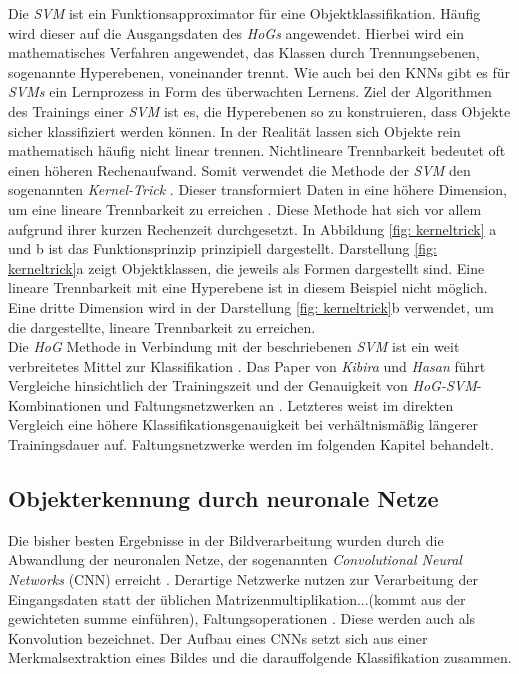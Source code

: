 		
		
		Die \textit{SVM} ist ein Funktionsapproximator für eine Objektklassifikation. Häufig wird dieser auf die Ausgangsdaten des \textit{HoGs} angewendet. Hierbei wird ein mathematisches Verfahren angewendet, das Klassen durch Trennungsebenen, sogenannte Hyperebenen, voneinander trennt. Wie auch bei den KNNs gibt es für \textit{SVMs} ein Lernprozess in Form des überwachten Lernens. Ziel der Algorithmen des Trainings einer \textit{SVM} ist es, die Hyperebenen so zu konstruieren, dass Objekte sicher klassifiziert werden können. In der Realität lassen sich Objekte rein mathematisch häufig nicht linear trennen. Nichtlineare Trennbarkeit bedeutet oft einen höheren Rechenaufwand. Somit verwendet die Methode der \textit{SVM} den sogenannten \textit{Kernel-Trick} \cite{svmalt}. Dieser transformiert Daten in eine höhere Dimension, um eine lineare Trennbarkeit zu erreichen \cite{svmalt}. Diese Methode hat sich vor allem aufgrund ihrer kurzen Rechenzeit durchgesetzt. In Abbildung \ref{fig: kerneltrick} a und b ist das Funktionsprinzip prinzipiell dargestellt. Darstellung \ref{fig: kerneltrick}a zeigt Objektklassen, die jeweils als Formen dargestellt sind. Eine lineare Trennbarkeit mit eine Hyperebene ist in diesem Beispiel nicht möglich. Eine dritte Dimension wird in der Darstellung \ref{fig: kerneltrick}b verwendet, um die dargestellte, lineare Trennbarkeit zu erreichen.\\
		
		
			
		Die \textit{HoG} Methode in Verbindung mit der beschriebenen \textit{SVM} ist ein weit verbreitetes Mittel zur Klassifikation \cite{hogsvmvscnn}. Das Paper von \textit{Kibira} und \textit{Hasan} führt Vergleiche hinsichtlich der Trainingszeit und der Genauigkeit von \textit{HoG-SVM}-Kombinationen und Faltungsnetzwerken an \cite{hogsvmvscnn}. Letzteres weist im direkten Vergleich eine höhere Klassifikationsgenauigkeit bei verhältnismäßig längerer Trainingsdauer auf. Faltungsnetzwerke werden im folgenden Kapitel behandelt. 
	
		\subsection{Objekterkennung durch neuronale Netze}
		\label{subsec: Objekterkennung durch neuronale Netze}
		Die bisher besten Ergebnisse in der Bildverarbeitung wurden durch die Abwandlung der neuronalen Netze, der sogenannten \textit{Convolutional Neural Networks} (CNN) erreicht \cite{deeplearning}. Derartige Netzwerke nutzen zur Verarbeitung der Eingangsdaten statt der üblichen Matrizenmultiplikation...(kommt aus der gewichteten summe einführen), Faltungsoperationen \cite{deeplearning}. Diese werden auch als Konvolution bezeichnet. Der Aufbau eines CNNs setzt sich aus einer Merkmalsextraktion eines Bildes und die darauffolgende Klassifikation zusammen.\\ 
		
